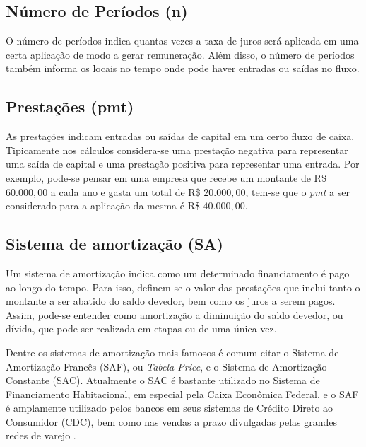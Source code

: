 \subsection{Número de Períodos (n)}

O número de períodos indica quantas vezes a taxa de juros será aplicada em uma certa aplicação de modo a gerar remuneração. Além disso, o número de períodos também informa os locais no tempo onde pode haver entradas ou saídas no fluxo.

\subsection{Prestações (pmt)}

As prestações indicam entradas ou saídas de capital em um certo fluxo de caixa. Tipicamente nos cálculos considera-se uma prestação negativa para representar uma saída de capital e uma prestação positiva para representar uma entrada. Por exemplo, pode-se pensar em uma empresa que recebe um montante de R\$ $60.000,00$ a cada ano e gasta um total de R\$ $20.000,00$, tem-se que o \textit{pmt} a ser considerado para a aplicação da mesma é R\$ $40.000,00$.


\subsection{Sistema de amortização (SA)}

Um sistema de amortização indica como um determinado financiamento é pago ao longo do tempo. Para isso, definem-se o valor das prestações que inclui tanto o montante a ser abatido do saldo devedor, bem como os juros a serem pagos. Assim, pode-se entender como amortização a diminuição do saldo devedor, ou dívida, que pode ser realizada em etapas ou de uma única vez.

Dentre os sistemas de amortização mais famosos é comum citar o Sistema de Amortização Francês (SAF), ou \textit{Tabela Price}, e o Sistema de Amortização Constante (SAC). Atualmente o SAC é bastante utilizado no Sistema de Financiamento Habitacional, em especial pela Caixa Econômica Federal, e o SAF é amplamente utilizado pelos bancos em seus sistemas de Crédito Direto ao Consumidor (CDC), bem como nas vendas a prazo divulgadas pelas grandes redes de varejo \cite{usoSACSAF}.

